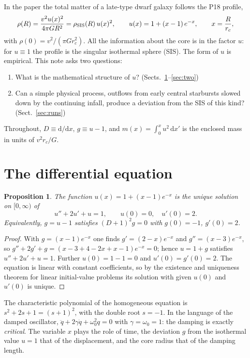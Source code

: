\documentclass[11pt,a4paper]{article}
\newtheorem{proposition}{Proposition}
\theoremstyle{remark}
\newcommand{\rc}{r_c}
\newcommand{\dd}{\mathrm{d}}
\begin{document}
In the paper the total matter of a late-type dwarf galaxy follows the P18 profile,
\begin{equation}
  \rho(R)=\frac{v^2u(x)^2}{4\pi GR^2}=\rho_{\rm SIS}(R)\,u(x)^2,\qquad
  u(x)=1+(x-1)\,e^{-x},\qquad x=\frac{R}{\rc},
  \label{eq:p18}
\end{equation}
with $\rho(0)=v^2/(\pi G\rc^2)$. All the information about the core is in the factor
$u$: for $u\equiv1$ the profile is the singular isothermal sphere (SIS). The form of
$u$ is empirical. This note asks two questions:
\begin{enumerate}
\item What is the mathematical structure of $u$? (Sects.~\ref{sec:ode}--\ref{sec:two})
\item Can a simple physical process, outflows from early central starbursts slowed down
  by the continuing infall, produce a deviation from the SIS of this kind?
  (Sect.~\ref{sec:runs})
\end{enumerate}
Throughout, $D\equiv\dd/\dd x$, $g\equiv u-1$, and $m(x)=\int_0^xu^2\,\dd x'$ is the
enclosed mass in units of $v^2\rc/G$.

\section{The differential equation}\label{sec:ode}

\begin{proposition}\label{prop:ode}
The function $u(x)=1+(x-1)e^{-x}$ is the unique solution on $[0,\infty)$ of
\begin{equation}
  u''+2u'+u=1,\qquad u(0)=0,\quad u'(0)=2 .
  \label{eq:ode}
\end{equation}
Equivalently, $g=u-1$ satisfies $(D+1)^2g=0$ with $g(0)=-1$, $g'(0)=2$.
\end{proposition}
\begin{proof}
With $g=(x-1)e^{-x}$ one finds $g'=(2-x)e^{-x}$ and $g''=(x-3)e^{-x}$, so
$g''+2g'+g=(x-3+4-2x+x-1)e^{-x}=0$; hence $u=1+g$ satisfies $u''+2u'+u=1$. Further
$u(0)=1-1=0$ and $u'(0)=g'(0)=2$. The equation is linear with constant coefficients, so
by the existence and uniqueness theorem for linear initial-value problems its solution
with given $u(0)$ and $u'(0)$ is unique.
\end{proof}

The characteristic polynomial of the homogeneous equation is $s^2+2s+1=(s+1)^2$, with
the double root $s=-1$. In the language of the damped oscillator,
$\ddot q+2\gamma\dot q+\omega_0^2q=0$ with $\gamma=\omega_0=1$: the damping is exactly
\emph{critical}. The variable $x$ plays the role of time, the deviation $g$ from the
isothermal value $u=1$ that of the displacement, and the core radius that of the
damping length.
\end{document}
